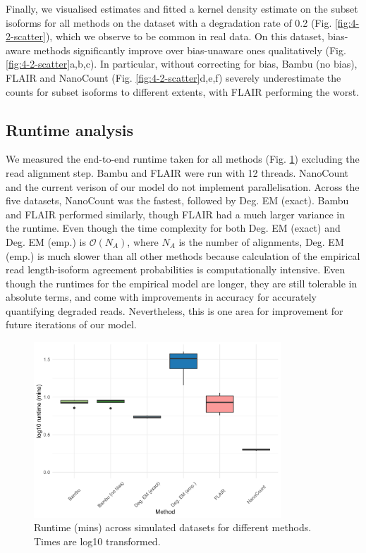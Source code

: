 \newpage

Finally, we visualised estimates and fitted a kernel density estimate on the subset isoforms for all methods on the dataset with a degradation rate of 0.2 (Fig. \ref{fig:4-2-scatter}), which we observe to be common in real data. On this dataset, bias-aware methods significantly improve over bias-unaware ones qualitatively (Fig. \ref{fig:4-2-scatter}a,b,c). In particular, without correcting for bias, Bambu (no bias), FLAIR and NanoCount (Fig. \ref{fig:4-2-scatter}d,e,f) severely underestimate the counts for subset isoforms to different extents, with FLAIR performing the worst.

\subsection{Runtime analysis}

We measured the end-to-end runtime taken for all methods (Fig. \ref{fig:runtime}) excluding the read alignment step. Bambu and FLAIR were run with 12 threads. NanoCount and the current verison of our model do not implement parallelisation. Across the five datasets, NanoCount was the fastest, followed by Deg. EM (exact). Bambu and FLAIR performed similarly, though FLAIR had a much larger variance in the runtime. Even though the time complexity for both Deg. EM (exact) and Deg. EM (emp.) is $\mathcal{O}(N_A)$, where $N_A$ is the number of alignments, Deg. EM (emp.) is much slower than all other methods because calculation of the empirical read length-isoform agreement probabilities is computationally intensive. Even though the runtimes for the empirical model are longer, they are still tolerable in absolute terms, and come with improvements in accuracy for accurately quantifying degraded reads. Nevertheless, this is one area for improvement for future iterations of our model.  

\begin{figure}[H]
    \centering
    \includegraphics[width=0.825\textwidth]{figures/sec-4-runtime.png}
    \caption[Runtime across simulated datasets for different methods]{Runtime (mins) across simulated datasets for different methods. Times are log10 transformed.}
    \label{fig:runtime}
\end{figure}

